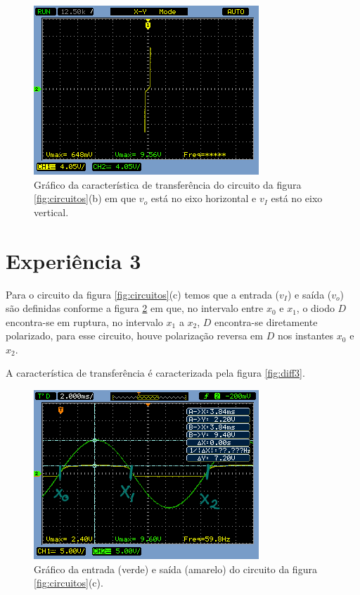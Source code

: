 \documentclass{abntex2}
\begin{document}
\begin{figure}[h]
  \centering
  \includegraphics[scale = 0.7]{diferenca-1b.png}
  \caption{Gráfico da característica de transferência do circuito da figura \ref{fig:circuitos}(b) em que $v_o$ está no eixo horizontal e $v_I$ está no eixo vertical.}
  \label{fig:diff2}
\end{figure}
\pagebreak
\section{Experiência 3}

Para o circuito da figura \ref{fig:circuitos}(c) temos que a entrada ($v_I$) e saída ($v_o$) são definidas conforme a figura \ref{fig:io3}  em que, no intervalo entre $x_0$ e $x_1$, o diodo $D$ encontra-se em ruptura, no intervalo $x_1$ a $x_2$, $D$ encontra-se diretamente polarizado, para esse circuito, houve polarização reversa em $D$ nos instantes $x_0$ e $x_2$.

A característica de transferência é caracterizada pela figura \ref{fig:diff3}.

\begin{figure}[h]
  \centering
  \includegraphics[scale = 0.7]{circuito-1c-esboco2.png}
  \caption{Gráfico da entrada (verde) e saída (amarelo) do circuito da figura \ref{fig:circuitos}(c).}
  \label{fig:io3}
\end{figure}
\end{document}
